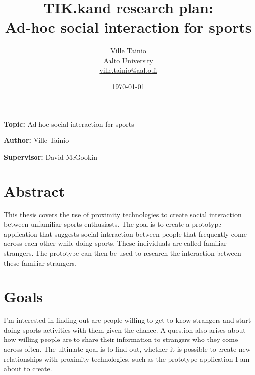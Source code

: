 \documentclass[12pt,a4paper,finnish,oneside]{article}
\begin{document}

\title{TIK.kand research plan:\\[5mm]
Ad-hoc social interaction for sports}

\author{Ville Tainio\\
Aalto University\\
\url{ville.tainio@aalto.fi}}

\date{\today}

\maketitle


%

\textbf{Topic:} Ad-hoc social interaction for sports

\textbf{Author:} Ville Tainio

\textbf{Supervisor:} David McGookin


\section{Abstract}

This thesis covers the use of proximity technologies to create social
interaction between unfamiliar sports enthusiasts. The goal is to create a
prototype application that suggests social interaction between people that
frequently come across each other while doing sports. These individuals are
called familiar strangers. The prototype can then be used to research
the interaction between these familiar strangers.

\section{Goals}

I'm interested in finding out are people willing to get to know strangers
and start doing sports activities with them given the chance. A question also
arises about how willing people are to share their information to strangers
who they come across often. The ultimate goal is to find out, whether it is
possible to create new relationships with proximity technologies, such as the
prototype application I am about to create.
\end{document}

